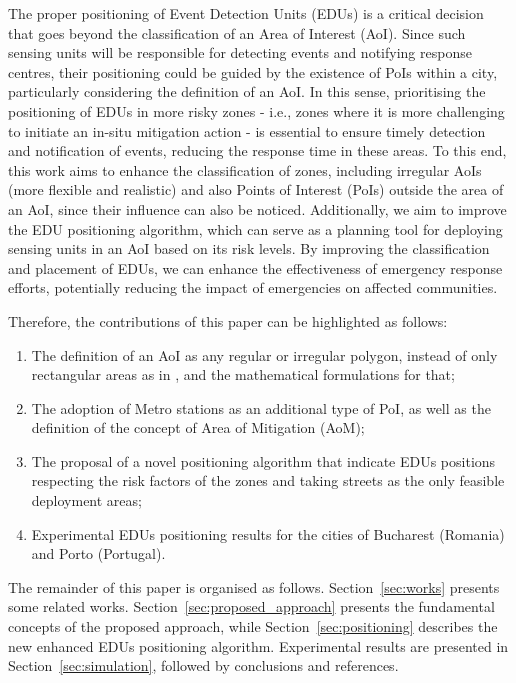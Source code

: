 \begin{refsection}
The proper positioning of Event Detection Units (EDUs) is a critical decision that goes beyond the classification of an Area of Interest (AoI). Since such sensing units will be responsible for detecting events and notifying response centres, their positioning could be guided by the existence of PoIs within a city, particularly considering the definition of an AoI. In this sense, prioritising the positioning of EDUs in more risky zones - i.e., zones where it is more challenging to initiate an in-situ mitigation action - is essential to ensure timely detection and notification of events, reducing the response time in these areas. To this end, this work aims to enhance the classification of zones, including irregular AoIs (more flexible and realistic) and also Points of Interest (PoIs) outside the area of an AoI, since their influence can also be noticed. Additionally, we aim to improve the EDU positioning algorithm, which can serve as a planning tool for deploying sensing units in an AoI based on its risk levels. By improving the classification and placement of EDUs, we can enhance the effectiveness of emergency response efforts, potentially reducing the impact of emergencies on affected communities.

Therefore, the contributions of this paper can be highlighted as follows:

\begin{enumerate}
  \item The definition of an AoI as any regular or irregular polygon, instead of only rectangular areas as in \cite{riskzones}, and the mathematical formulations for that;
  \item The adoption of Metro stations as an additional type of PoI, as well as the definition of the concept of Area of Mitigation (AoM);
  \item The proposal of a novel positioning algorithm that indicate EDUs positions respecting the risk factors of the zones and taking streets as the only feasible deployment areas;
  \item Experimental EDUs positioning results for the cities of Bucharest (Romania) and Porto (Portugal).
\end{enumerate}

The remainder of this paper is organised as follows. Section~\ref{sec:works} presents some related works. Section~\ref{sec:proposed_approach} presents the fundamental concepts of the proposed approach, while Section~\ref{sec:positioning} describes the new enhanced EDUs positioning algorithm. Experimental results are presented in Section~\ref{sec:simulation}, followed by conclusions and references.


\end{refsection}
